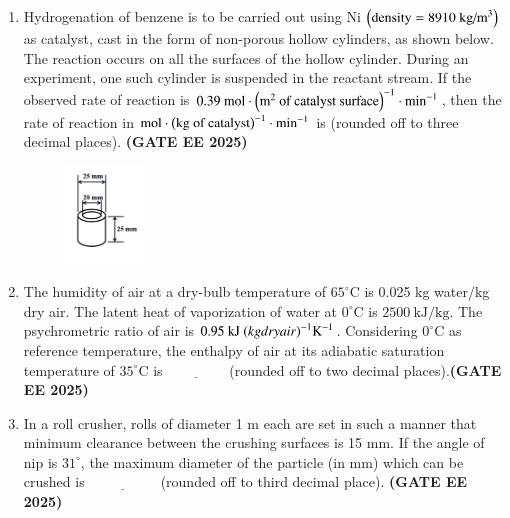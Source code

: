 \documentclass[journal,12pt,onecolumn]{IEEEtran}
\theoremstyle{remark}
\begin{document}
\begin{enumerate}
\item Hydrogenation of benzene is to be carried out using Ni $\left(\text{density} = 8910~\text{kg/m}^{3}\right)$ as catalyst, cast in the form of non-porous hollow cylinders, as shown below. The reaction occurs on all the surfaces of the hollow cylinder. During an experiment, one such cylinder is suspended in the reactant stream. If the observed rate of reaction is $0.39~\text{mol}\cdot\left(\text{m}^2 \text{ of catalyst surface}\right)^{-1}\cdot\text{min}^{-1}$, then the rate of reaction in $\text{mol}\cdot\left(\text{kg of catalyst}\right)^{-1}\cdot\text{min}^{-1}$ is\underline{\hspace{2cm}} (rounded off to three decimal places). \hfill \textbf{(GATE EE 2025)} 
	\begin{figure}

\begin{center}
\includegraphics[width=0.2\textwidth]{figs/52.png}
      \caption{}
      \label{fig52}
	\end{center}
	\end{figure}


\item The humidity of air at a dry-bulb temperature of $65^{\circ}\text{C}$ is 0.025 kg water/kg dry air. The latent heat of vaporization of water at $0^{\circ}\text{C}$ is $2500~\text{kJ/kg}$. The psychrometric ratio of air is $0.95~\text{kJ \ensuremath{\left(kg dry air\right)}}^{-1}\text{K}^{-1}$. Considering $0^{\circ}\text{C}$ as reference temperature, the enthalpy of air  at its adiabatic saturation temperature of $35^{\circ}\text{C}$ is$\underline{\hspace{2cm}}$(rounded off to two decimal places).\hfill \textbf{(GATE EE 2025)} 



\item  In a roll crusher, rolls of diameter 1 m each are set in such a manner that minimum clearance between the crushing surfaces is 15 mm. If the angle of nip is $31^{\circ}$, the maximum diameter of the particle  (in mm) which can be crushed is $\underline{\hspace{2cm}}$ (rounded off to third decimal place).
\hfill \textbf{(GATE EE 2025)} 


\end{enumerate}
\end{document}
